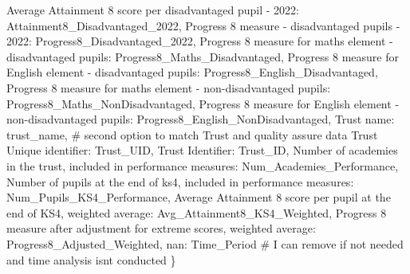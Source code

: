 \documentclass[
  letterpaper,
  DIV=11,
  numbers=noendperiod]{scrartcl}
\newenvironment{Shaded}{\begin{snugshade}}{\end{snugshade}}
\newcommand{\CommentTok}[1]{\textcolor[rgb]{0.37,0.37,0.37}{#1}}
\newcommand{\NormalTok}[1]{\textcolor[rgb]{0.00,0.23,0.31}{#1}}
\newcommand{\StringTok}[1]{\textcolor[rgb]{0.13,0.47,0.30}{#1}}
\begin{document}
\begin{Shaded}
\begin{Highlighting}[]
    \StringTok{\textquotesingle{}Average Attainment 8 score per disadvantaged pupil {-} 2022\textquotesingle{}}\NormalTok{: }\StringTok{\textquotesingle{}Attainment8\_Disadvantaged\_2022\textquotesingle{}}\NormalTok{,}
    \StringTok{\textquotesingle{}Progress 8 measure {-} disadvantaged pupils {-} 2022\textquotesingle{}}\NormalTok{: }\StringTok{\textquotesingle{}Progress8\_Disadvantaged\_2022\textquotesingle{}}\NormalTok{,}
    \StringTok{\textquotesingle{}Progress 8 measure for maths element {-} disadvantaged pupils\textquotesingle{}}\NormalTok{: }\StringTok{\textquotesingle{}Progress8\_Maths\_Disadvantaged\textquotesingle{}}\NormalTok{,}
    \StringTok{\textquotesingle{}Progress 8 measure for English element {-} disadvantaged pupils\textquotesingle{}}\NormalTok{: }\StringTok{\textquotesingle{}Progress8\_English\_Disadvantaged\textquotesingle{}}\NormalTok{,}
    \StringTok{\textquotesingle{}Progress 8 measure for maths element {-} non{-}disadvantaged pupils\textquotesingle{}}\NormalTok{: }\StringTok{\textquotesingle{}Progress8\_Maths\_NonDisadvantaged\textquotesingle{}}\NormalTok{,}
    \StringTok{\textquotesingle{}Progress 8 measure for English element {-} non{-}disadvantaged pupils\textquotesingle{}}\NormalTok{: }\StringTok{\textquotesingle{}Progress8\_English\_NonDisadvantaged\textquotesingle{}}\NormalTok{,}
    \StringTok{\textquotesingle{}Trust name\textquotesingle{}}\NormalTok{: }\StringTok{\textquotesingle{}trust\_name\textquotesingle{}}\NormalTok{, }\CommentTok{\# second option to match Trust and quality assure data}
    \StringTok{\textquotesingle{}Trust Unique identifier\textquotesingle{}}\NormalTok{: }\StringTok{\textquotesingle{}Trust\_UID\textquotesingle{}}\NormalTok{,}
    \StringTok{\textquotesingle{}Trust Identifier\textquotesingle{}}\NormalTok{: }\StringTok{\textquotesingle{}Trust\_ID\textquotesingle{}}\NormalTok{,}
    \StringTok{\textquotesingle{}Number of academies in the trust, included in performance measures\textquotesingle{}}\NormalTok{: }\StringTok{\textquotesingle{}Num\_Academies\_Performance\textquotesingle{}}\NormalTok{,}
    \StringTok{\textquotesingle{}Number of pupils at the end of ks4, included in performance measures\textquotesingle{}}\NormalTok{: }\StringTok{\textquotesingle{}Num\_Pupils\_KS4\_Performance\textquotesingle{}}\NormalTok{,}
    \StringTok{\textquotesingle{}Average Attainment 8 score per pupil at the end of KS4, weighted average\textquotesingle{}}\NormalTok{: }\StringTok{\textquotesingle{}Avg\_Attainment8\_KS4\_Weighted\textquotesingle{}}\NormalTok{,}
    \StringTok{\textquotesingle{}Progress 8 measure after adjustment for extreme scores, weighted average\textquotesingle{}}\NormalTok{: }\StringTok{\textquotesingle{}Progress8\_Adjusted\_Weighted\textquotesingle{}}\NormalTok{,}
    \StringTok{\textquotesingle{}nan\textquotesingle{}}\NormalTok{: }\StringTok{\textquotesingle{}Time\_Period\textquotesingle{}}  \CommentTok{\# I can remove if not needed and time analysis isnt conducted}
\NormalTok{\}}

\end{Highlighting}
\end{Shaded}
\end{document}
